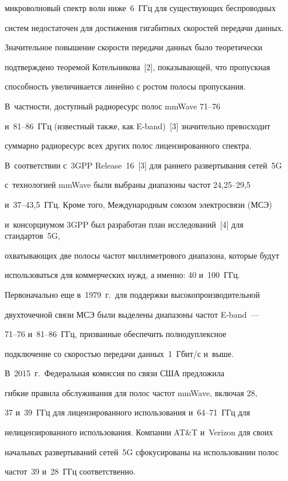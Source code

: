 микроволновый спектр волн ниже~6~ГГц для существующих беспроводных 


систем недостаточен для достижения гигабитных скоростей передачи данных. 


Значительное повышение скорости передачи данных было теоретически 


подтверждено теоремой Котельникова~[2], показывающей, что пропускная 


способность увеличивается линейно с ростом полосы пропускания. 


В~частности, доступный радиоресурс полос mmWave \mbox{71--76}  


и~81--86~ГГц (известный также, как E-band)~[3] значительно превосходит 


суммарно радиоресурс всех других полос лицензированного спектра. 


В~соответствии с~3GPP Release~16~[3] для раннего развертывания сетей~5G 


с~технологией mmWave были выбраны диапазоны частот 24,25--29,5  


и~37--43,5~ГГц. Кроме того, Международным союзом электросвязи (МСЭ) 


и~консорциумом 3GPP был разработан план исследований~[4] для стандартов~5G, 


охватывающих две полосы частот миллиметрового диапазона, которые будут 


использоваться для коммерческих нужд, а именно: 40 и~100~ГГц. 


Первоначально еще в~1979~г.\ для поддержки высокопроизводительной 


двухточечной связи МСЭ были выделены диапазоны частот E-band~---  


71--76 и~81--86~ГГц, призванные обеспечить полнодуплексное 


подключение со скоростью передачи данных~1~Гбит/с и~выше. 


 В~2015~г.\ Федеральная комиссия по связи США предложила 


гибкие правила обслуживания для полос частот mmWave, включая 28, 


37 и~39~ГГц для лицензированного использования и~64--71~ГГц для 


нелицензированного использования. Компании AT\&T и~Verizon для своих 


начальных развертываний сетей~5G сфокусированы на использовании полос 


частот~39 и~28~ГГц соответственно.


